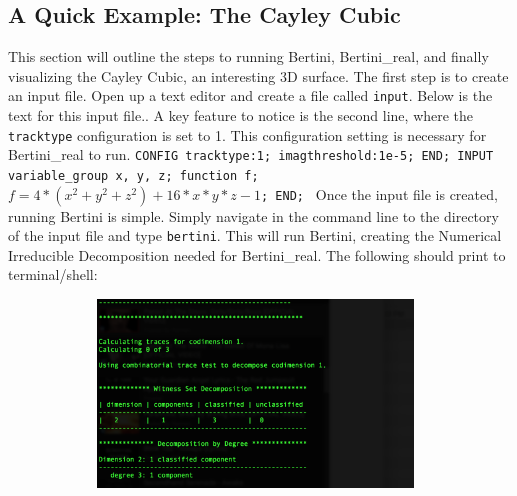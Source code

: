 \documentclass[10pt]{article}
\begin{document}
\subsection{A Quick Example: The Cayley Cubic}
This section will outline the steps to running Bertini, Bertini\_real, and finally visualizing the Cayley Cubic, an interesting 3D surface. The first step is to create an input file. Open up a text editor and create a file called \texttt{input}. 
Below is the text for this input file.. A key feature to notice is the second line, where the \texttt{tracktype} configuration is set to 1. This configuration setting is necessary for Bertini\_real to run.  \newline \newline
\texttt{CONFIG \newline
tracktype:1;\newline
imagthreshold:1e-5;\newline
END;\newline
INPUT\newline
variable\_group x, y, z;\newline
function f;\newline
$f = 4 * (x^2 + y^2 + z^2) + 16*x*y*z - 1$;\newline
END; \newline}
\clearpage
Once the input file is created, running Bertini is simple. Simply navigate in the command line to the directory of the input file and type \texttt{bertini}. This will run Bertini, creating the Numerical Irreducible Decomposition needed for Bertini\_real. The following should print to terminal/shell: \par
\begin{figure}[!hb]
	\includegraphics[width = 11cm, height = 5cm]{CayleyCubicBertiniRun.png}
\end{figure}
\end{document}
